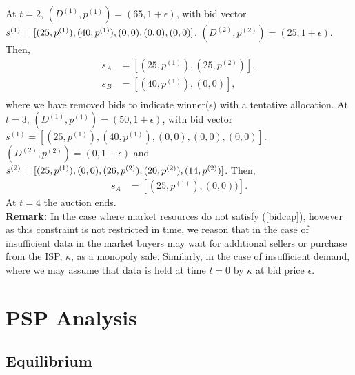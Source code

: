 \documentclass[sigconf, anonymous]{acmart}
\theoremstyle{definition}
\begin{document}
At $t=2$, $(D^{(1)},p^{(1)}) = (65,1+\epsilon)$, with
bid vector $s^{(1)}=[(25,p^{(1)}),\\ (40,p^{(1)}), (0,0), (0,0),
(0,0)]$. $(D^{(2)},p^{(2)}) = (25, 1+\epsilon)$. Then,
\begin{align*}
    s_A &= [(25,p^{(1)}), (25,p^{(2)})], \\
    s_B &= [(40,p^{(1)}), (0,0)], \\
\end{align*}
where we have removed bids to indicate winner(s) with a tentative allocation.
At $t=3$, $(D^{(1)},p^{(1)}) = (50,1+\epsilon)$, with
bid vector $s^{(1)}=[(25,p^{(1)}), (40,p^{(1)}), (0,0), (0,0),
(0,0)]$. $(D^{(2)},p^{(2)}) = (0, 1+\epsilon)$ and $s^{(2)}=[(25,p^{(1)}),
(0,0), (26,p^{(2)}), (20,p^{(2)}),\\(14,p^{(2)})]$. Then,
\begin{align*}
    s_A &= [(25,p^{(1)}), (0,0))].
\end{align*}
At $t=4$ the auction ends.\\
\textbf{Remark:} In the case where market resources do not satisfy (\ref{bidcap}), however as
this constraint is not restricted in time, we reason that in the case of
insufficient data in the market buyers may wait for additional sellers or
purchase from the ISP, $\kappa$, as a monopoly sale. Similarly, in
the case of insufficient demand, where we may assume that data is held at time
$t=0$ by $\kappa$ at bid price $\epsilon$.

\section{PSP Analysis}\label{analysis}


\subsection{Equilibrium}
\end{document}
